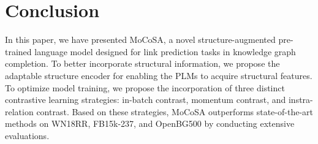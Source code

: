 \documentclass[11pt]{article}
\begin{document}
\section{Conclusion}

In this paper, we have presented MoCoSA, a novel structure-augmented pre-trained language model designed for link prediction tasks in knowledge graph completion. To better incorporate structural information, we propose the adaptable structure encoder for enabling the PLMs to acquire structural features. To optimize model training, we propose the incorporation of three distinct contrastive learning strategies: in-batch contrast, momentum contrast, and instra-relation contrast. Based on these strategies, MoCoSA outperforms state-of-the-art methods on WN18RR, FB15k-237, and OpenBG500 by conducting extensive evaluations.
 


\clearpage


\end{document}
